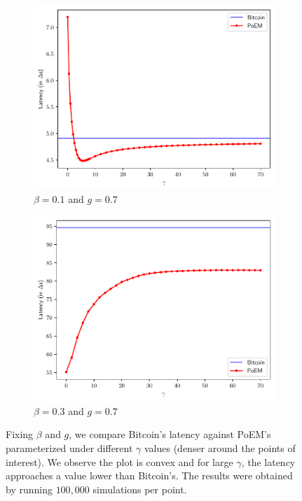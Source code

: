 \begin{figure}[h]
    \centering
    \begin{subfigure}{0.8\textwidth}
    \centering
    \includegraphics[width = \textwidth]{figures/gamma_latency_0.1.pdf}
    \caption{$\beta = 0.1$ and $g = 0.7$}
    \label{fig:gamma_latency_0.1}
    \end{subfigure}
    \begin{subfigure}{0.8\textwidth}
    \centering
    \includegraphics[width = \textwidth]{figures/gamma_latency_0.3.pdf}
    \caption{$\beta = 0.3$ and $g = 0.7$}
    \label{fig:gamma_latency_0.3}
    \end{subfigure}

  \caption{Fixing $\beta$ and $g$, we compare Bitcoin's latency against PoEM's parameterized under different $\gamma$ values
           (denser around the points of interest).
          We observe the plot is convex and for large $\gamma$, the latency
          approaches a value lower than Bitcoin's. The results were obtained by running $100{,}000$ simulations per point.}
    \label{fig:gamma_latency}
\end{figure}